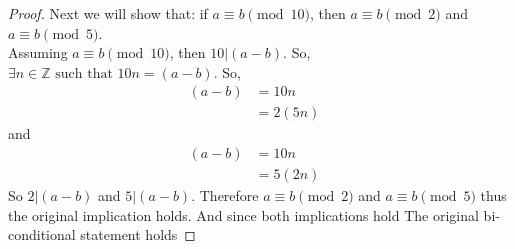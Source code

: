 \documentclass{article}
\newcommand{\ints}{\mathbb{Z}}
\newcommand{\st}{\text{ such that }}
\begin{document}
\begin{enumerate}
\begin{proof}
			Next we will show that: if $a \equiv b \pmod{10}$, then  $a \equiv b \pmod{2}$ and $a \equiv b \pmod{5}$.\\
			Assuming $a \equiv b \pmod{10}$, then $10|(a-b)$. So, $\exists n \in \ints \st 10n=(a-b)$. 
			So, 
			\begin{align*}
				(a-b) &= 10n &\\
					  &= 2(5n)
			\end{align*}
			and 
			\begin{align*}
				(a-b) &= 10n&\\
				 	  &= 5(2n)
			\end{align*}
			So $2|(a-b)$ and $5|(a-b)$. Therefore $a \equiv b \pmod{2}$ and $a \equiv b \pmod{5}$ thus the original implication holds. 
			And since both implications hold The original bi-conditional statement holds

		\end{proof}
	\end{enumerate}
\end{document}

